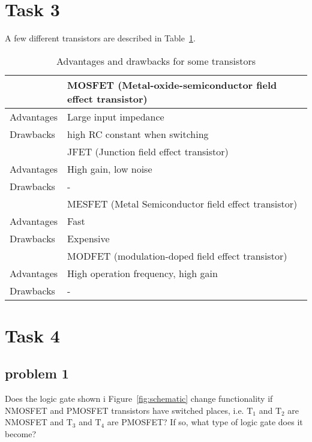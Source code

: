 \documentclass[12pt,a4paper]{article}
\begin{document}
\section{Task 3}
A few different transistors are described in Table~\ref{tab:transistors}.
\begin{table}[!ht]
  \centering
  \caption{Advantages and drawbacks for some transistors}
  \begin{tabular}{|l|l|}\hline
    & MOSFET (Metal-oxide-semiconductor field effect transistor) \\\hline
    Advantages & Large input impedance \\\hline
    Drawbacks & high RC constant when switching \\\hline
    & JFET (Junction field effect transistor) \\\hline
    Advantages & High gain, low noise \\\hline
    Drawbacks & - \\\hline
    & MESFET (Metal Semiconductor field effect transistor) \\\hline
    Advantages & Fast \\\hline
    Drawbacks & Expensive \\\hline
    & MODFET (modulation-doped field effect transistor) \\\hline
    Advantages & High operation frequency, high gain \\\hline
    Drawbacks & - \\\hline
  \end{tabular}
  \label{tab:transistors}
\end{table}

\section{Task 4}
\subsection{problem 1}
Does the logic gate shown i Figure~\ref{fig:schematic} change functionality if NMOSFET and PMOSFET transistors have switched places, i.e. $\text{T}_{1}$ and $\text{T}_{2}$ are NMOSFET and $\text{T}_{3}$ and $\text{T}_{4}$ are PMOSFET?
If so, what type of logic gate does it become?
\end{document}
